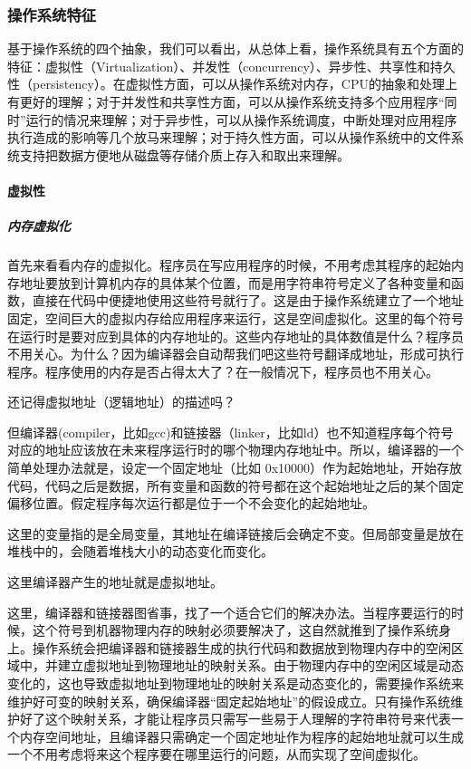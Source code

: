 \subsubsection{操作系统特征}

基于操作系统的四个抽象，我们可以看出，从总体上看，操作系统具有五个方面的特征：虚拟性（Virtualization）、并发性（concurrency）、异步性、共享性和持久性（persistency）。在虚拟性方面，可以从操作系统对内存，CPU的抽象和处理上有更好的理解；对于并发性和共享性方面，可以从操作系统支持多个应用程序“同时”运行的情况来理解；对于异步性，可以从操作系统调度，中断处理对应用程序执行造成的影响等几个放马来理解；对于持久性方面，可以从操作系统中的文件系统支持把数据方便地从磁盘等存储介质上存入和取出来理解。

\paragraph{虚拟性}

\subparagraph{内存虚拟化}

首先来看看内存的虚拟化。程序员在写应用程序的时候，不用考虑其程序的起始内存地址要放到计算机内存的具体某个位置，而是用字符串符号定义了各种变量和函数，直接在代码中便捷地使用这些符号就行了。这是由于操作系统建立了一个地址固定，空间巨大的虚拟内存给应用程序来运行，这是空间虚拟化。这里的每个符号在运行时是要对应到具体的内存地址的。这些内存地址的具体数值是什么？程序员不用关心。为什么？因为编译器会自动帮我们吧这些符号翻译成地址，形成可执行程序。程序使用的内存是否占得太大了？在一般情况下，程序员也不用关心。

还记得虚拟地址（逻辑地址）的描述吗？  

但编译器(compiler，比如gcc)和链接器（linker，比如ld）也不知道程序每个符号对应的地址应该放在未来程序运行时的哪个物理内存地址中。所以，编译器的一个简单处理办法就是，设定一个固定地址（比如 0x10000）作为起始地址，开始存放代码，代码之后是数据，所有变量和函数的符号都在这个起始地址之后的某个固定偏移位置。假定程序每次运行都是位于一个不会变化的起始地址。  

这里的变量指的是全局变量，其地址在编译链接后会确定不变。但局部变量是放在堆栈中的，会随着堆栈大小的动态变化而变化。  

这里编译器产生的地址就是虚拟地址。  

这里，编译器和链接器图省事，找了一个适合它们的解决办法。当程序要运行的时候，这个符号到机器物理内存的映射必须要解决了，这自然就推到了操作系统身上。操作系统会把编译器和链接器生成的执行代码和数据放到物理内存中的空闲区域中，并建立虚拟地址到物理地址的映射关系。由于物理内存中的空闲区域是动态变化的，这也导致虚拟地址到物理地址的映射关系是动态变化的，需要操作系统来维护好可变的映射关系，确保编译器“固定起始地址”的假设成立。只有操作系统维护好了这个映射关系，才能让程序员只需写一些易于人理解的字符串符号来代表一个内存空间地址，且编译器只需确定一个固定地址作为程序的起始地址就可以生成一个不用考虑将来这个程序要在哪里运行的问题，从而实现了空间虚拟化。


